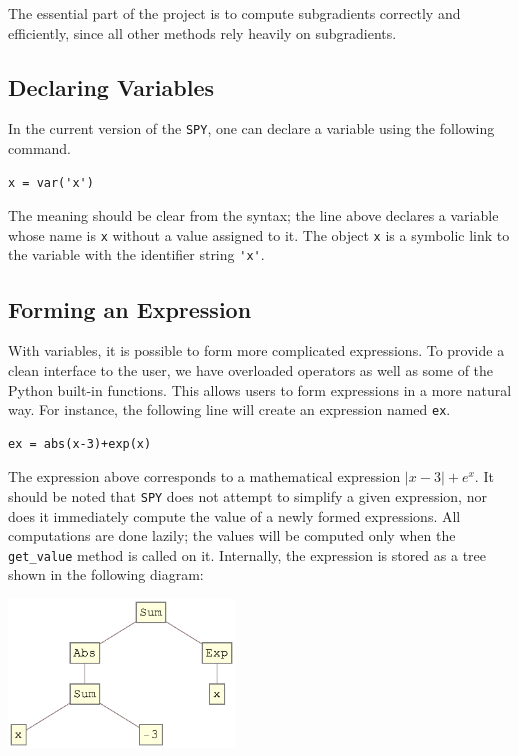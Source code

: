 \documentclass[12pt]{article}
\begin{document}
The essential part of the project is to compute subgradients correctly
and efficiently, since all other methods rely heavily on subgradients.



\subsection{Declaring Variables}
In the current version of the \verb'SPY', one can declare a variable using the following command.
\begin{verbatim}
x = var('x')
\end{verbatim}
The meaning should be clear from the syntax; the line above declares a
variable whose name is \verb'x' without a value assigned to it. The object \verb'x' is a symbolic link to the variable with the identifier string \verb,'x',.

\subsection{Forming an Expression}
With variables, it is possible to form more complicated expressions. To
provide a clean interface to the user, we have overloaded operators as
well as some of the Python built-in functions. This allows users to form
expressions in a more natural way. For instance, the following line will create an expression named \verb'ex'.
\begin{verbatim}
ex = abs(x-3)+exp(x)
\end{verbatim}
The expression above corresponds to a mathematical expression
$|x-3|+e^x$. It should be noted that \verb'SPY' does not attempt to
simplify a given expression, nor does it immediately compute the value of
a newly formed expressions. All computations are done lazily; the
values will be computed only when the \verb'get_value' method is called on
it. Internally, the expression is stored as a tree shown in the following diagram:


\begin{center}
\includegraphics[width=0.45\textwidth]{expr}
\end{center}
\end{document}
